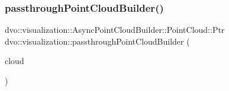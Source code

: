 \subsubsection{\texorpdfstring{passthrough\+Point\+Cloud\+Builder()}{passthroughPointCloudBuilder()}}
{\footnotesize\ttfamily dvo\+::visualization\+::\+Async\+Point\+Cloud\+Builder\+::\+Point\+Cloud\+::\+Ptr dvo\+::visualization\+::passthrough\+Point\+Cloud\+Builder (\begin{DoxyParamCaption}\item[{const dvo\+::visualization\+::\+Async\+Point\+Cloud\+Builder\+::\+Point\+Cloud\+::\+Ptr \&}]{cloud }\end{DoxyParamCaption})}

